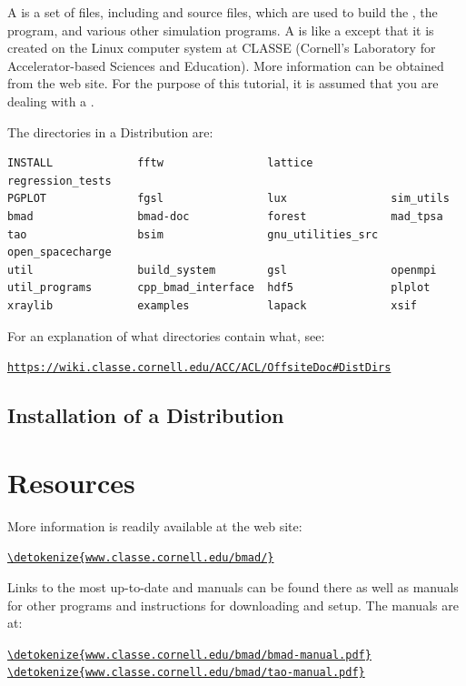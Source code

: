 \documentclass{hitec}     %
\newcommand{\Section}[1]{\section{#1}\vspace*{-1ex}}
\newenvironment{display}
  {\vspace*{-1.5ex} \begin{alltt}}
  {\end{alltt} \vspace*{-1.0ex}}
\begin{document}
A  is a set of files, including \bmad and \tao source files, which are used to
build the \bmad, the \tao program, and various other simulation programs. A  is like a
 except that it is created on the Linux computer system at CLASSE (Cornell's
Laboratory for Accelerator-based Sciences and Education). More information can be obtained from the
\bmad web site. For the purpose of this tutorial, it is assumed that you are dealing with a
.

The directories in a Distribution are:
\begin{lstlisting}[mathescape]
INSTALL             fftw                lattice            regression_tests
PGPLOT              fgsl                lux                sim_utils
bmad                bmad-doc            forest             mad_tpsa
tao                 bsim                gnu_utilities_src  open_spacecharge
util                build_system        gsl                openmpi
util_programs       cpp_bmad_interface  hdf5               plplot
xraylib             examples            lapack             xsif
\end{lstlisting}

For an explanation of what directories contain what, see:
\begin{display}
  \url{https://wiki.classe.cornell.edu/ACC/ACL/OffsiteDoc#DistDirs}
\end{display}

\subsection{Installation of a Distribution}
\label{s:install.dist}


\newpage

\Section{Resources}
\label{s:resources}

More information is readily available at the \bmad web site:
\begin{display}
  \url{\detokenize{www.classe.cornell.edu/bmad/}}
\end{display}
Links to the most up-to-date \bmad and \tao manuals can be found there as well as manuals for other
programs and instructions for downloading and setup. The manuals are at:
\begin{display}
  \url{\detokenize{www.classe.cornell.edu/bmad/bmad-manual.pdf}}
  \url{\detokenize{www.classe.cornell.edu/bmad/tao-manual.pdf}}
\end{display}
\end{document}
